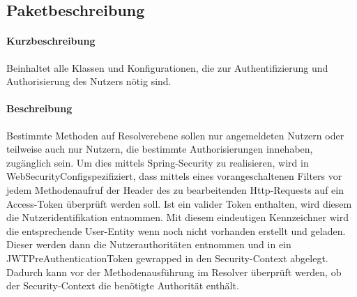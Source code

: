 \subsection*{Paketbeschreibung}%
\paragraph*{Kurzbeschreibung}
Beinhaltet alle Klassen und Konfigurationen, die zur Authentifizierung und Authorisierung des Nutzers nötig sind.
\paragraph*{Beschreibung}
Bestimmte Methoden auf Resolverebene sollen nur angemeldeten Nutzern oder teilweise auch nur Nutzern, die bestimmte Authorisierungen
innehaben, zugänglich sein. Um dies mittels Spring-Security zu realisieren, wird in \dq WebSecurityConfig\dq spezifiziert, dass mittels eines vorangeschaltenen Filters vor jedem
Methodenaufruf der Header des zu bearbeitenden Http-Requests auf ein Access-Token überprüft werden soll. Ist ein valider Token enthalten, 
wird diesem die Nutzeridentifikation entnommen. Mit diesem eindeutigen Kennzeichner wird die entsprechende User-Entity
wenn noch nicht vorhanden erstellt und geladen. Dieser werden dann  die Nutzerauthoritäten entnommen und in ein JWTPreAuthenticationToken gewrapped in den Security-Context abgelegt. Dadurch kann vor der Methodenausführung
im Resolver überprüft werden, ob der Security-Context die benötigte Authorität enthält.

